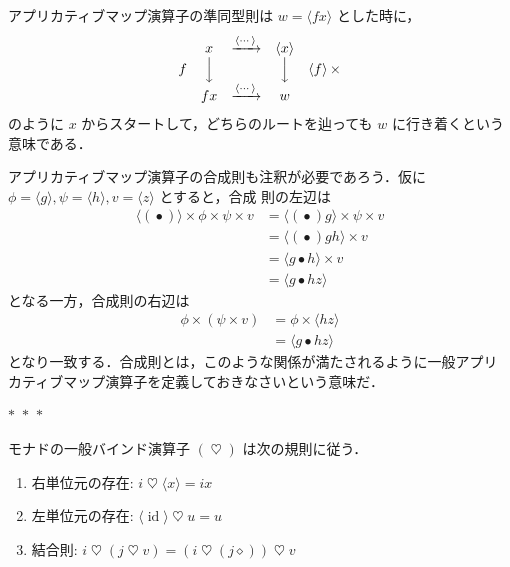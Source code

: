 \documentclass[a5paper,twoside,fleqn,draft]{jsbook}
\newcommand{\separator}{\begin{center}$*$~$*$~$*$\end{center}}
\newcommand{\mAnonParam}{\diamond}
\DeclareMathOperator{\mId}{id}
\DeclareMathOperator{\mAppMap}{\times}
\DeclareMathOperator{\mBind}{\heartsuit}
\DeclareMathOperator{\mComp}{\bullet} %
\newcommand{\mPureWith}[1]{\langle#1\rangle}
\begin{document}
アプリカティブマップ演算子の準同型則は $w=\mPureWith{fx}$ とした時に，
\begin{equation}
\begin{matrix}
&x&\xrightarrow{\mPureWith{\dotsb}}&\mPureWith{x}\\
f&\Big\downarrow&&\Big\downarrow&\mPureWith{f}\mAppMap\\
&fx&\xrightarrow{\mPureWith{\dotsb}}&w
\end{matrix}
\end{equation}
のように $x$ からスタートして，どちらのルートを辿っても $w$ に行き着くという意味である．

アプリカティブマップ演算子の合成則も注釈が必要であろう．仮に
$\phi=\mPureWith{g},\psi=\mPureWith{h},v=\mPureWith{z}$ とすると，合成
則の左辺は
\begin{align}
\mPureWith{(\mComp)}\mAppMap\phi\mAppMap\psi\mAppMap v
&=\mPureWith{(\mComp)g}\mAppMap\psi\mAppMap v\\
&=\mPureWith{(\mComp)gh}\mAppMap v\\
&=\mPureWith{g\mComp h}\mAppMap v\\
&=\mPureWith{g\mComp hz}
\end{align}
となる一方，合成則の右辺は
\begin{align}
\phi\mAppMap{}(\psi\mAppMap v)
&=\phi\mAppMap\mPureWith{hz}\\
&=\mPureWith{g\mComp hz}
\end{align}
となり一致する．合成則とは，このような関係が満たされるように一般アプリ
カティブマップ演算子を定義しておきなさいという意味だ．

\separator

モナドの一般バインド演算子 $(\mBind)$ は次の規則に従う．
\begin{enumerate}
\item 右単位元の存在: $i\mBind{}\mPureWith{x}=ix$
\item 左単位元の存在: $\mPureWith{\mId}\mBind u=u$
\item 結合則: $i\mBind{}(j\mBind v)=(i\mBind{}(j\mAnonParam))\mBind v$
\end{enumerate}
\end{document}
